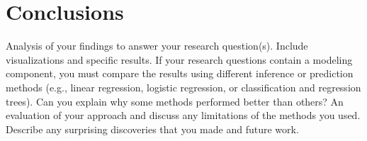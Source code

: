 \section{Conclusions}
Analysis of your findings to answer your research question(s). Include visualizations and specific results. If your research questions contain a modeling component, you must compare the results using different inference or prediction methods (e.g., linear regression, logistic regression, or classification and regression trees). Can you explain why some methods performed better than others?
An evaluation of your approach and discuss any limitations of the methods you used.
Describe any surprising discoveries that you made and future work.